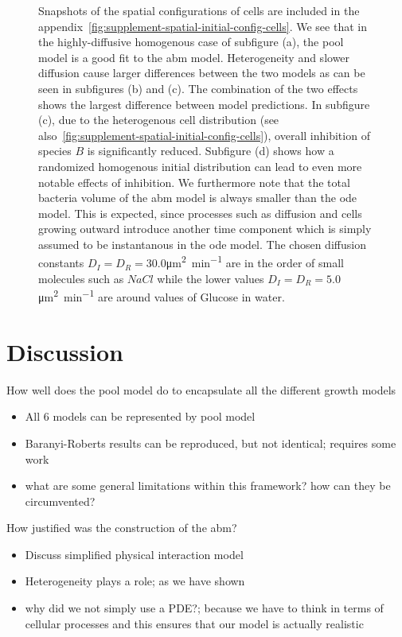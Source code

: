 \documentclass[10pt,A4paper]{article}
\numberwithin{equation}{section}
\begin{document}
\begin{figure}
{        Snapshots of the spatial configurations of cells are included in the appendix~\ref{fig:supplement-spatial-initial-config-cells}.
        We see that in the highly-diffusive homogenous case of subfigure (a), the pool model is a good fit to the \ac{abm} model.
        Heterogeneity and slower diffusion cause larger differences between the two models as can be seen in subfigures (b) and (c).
        The combination of the two effects shows the largest difference between model predictions.
        In subfigure (c), due to the heterogenous cell distribution (see also~\ref{fig:supplement-spatial-initial-config-cells}), overall inhibition of species $B$ is significantly reduced.
        Subfigure (d) shows how a randomized homogenous initial distribution can lead to even more notable effects of inhibition.
        We furthermore note that the total bacteria volume of the \ac{abm} model is always smaller than the \ac{ode} model.
        This is expected, since processes such as diffusion and cells growing outward introduce another time component which is simply assumed to be instantanous in the \ac{ode} model.
        The chosen diffusion constants $D_I=D_R=30.0$\unit{\micro\metre\squared\per\minute} are in the order of small molecules such as $NaCl$ while the lower values $D_I=D_R=5.0$\unit{\micro\metre\squared\per\minute} are around values of Glucose in water.
    }
    \label{fig:spatial-growth-curve}
\end{figure}
%
%
\section{Discussion}

How well does the pool model do to encapsulate all the different growth models
\begin{itemize}
    \item All 6 models can be represented by pool model
    \item Baranyi-Roberts results can be reproduced, but not identical; requires some work
    \item what are some general limitations within this framework? how can they be circumvented?
\end{itemize}

\noindent
How justified was the construction of the \ac{abm}?
\begin{itemize}
    \item Discuss simplified physical interaction model
    \item Heterogeneity plays a role; as we have shown
    \item why did we not simply use a PDE?; because we have to think in terms of cellular processes
        and this ensures that our model is actually realistic
\end{itemize}
\end{document}
